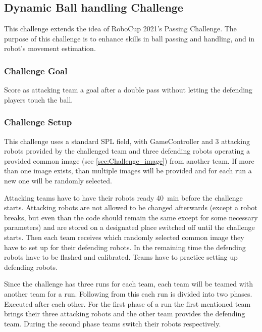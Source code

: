 \clearpage
\newpage

\subsection{Dynamic Ball handling Challenge}

    This challenge extends the idea of RoboCup 2021's Passing Challenge. The purpose of this challenge is to enhance skills in ball passing and handling, and in robot's movement estimation.

    \subsubsection{Challenge Goal}

        Score as attacking team a goal after a double pass without letting the defending players touch the ball.

    \subsubsection{Challenge Setup}

        This challenge uses a standard SPL field, with GameController and 3 attacking robots provided by the challenged team and three defending robots operating a provided common image (see \cref{sec:Challenge_image}) from another team. If more than one image exists, than multiple images will be provided and for each run a new one will be randomly selected.

        Attacking teams have to have their robots ready \qty{40}{\minute} before the challenge starts. Attacking robots are not allowed to be changed afterwards (except a robot breaks, but even than the code should remain the same except for some necessary parameters) and are stored on a designated place switched off until the challenge starts. Then each team receives  which randomly selected common image they have to set up for their defending robots. In the remaining time the defending robots have to be flashed and calibrated. Teams have to practice setting up defending robots.

        Since the challenge has three runs for each team, each team will be teamed with another team for a run. Following from this each run is divided into two phases. Executed after each other. For the first phase of a run the first mentioned team brings their three attacking robots and the other team provides the defending team. During the second phase teams switch their robots respectively.

